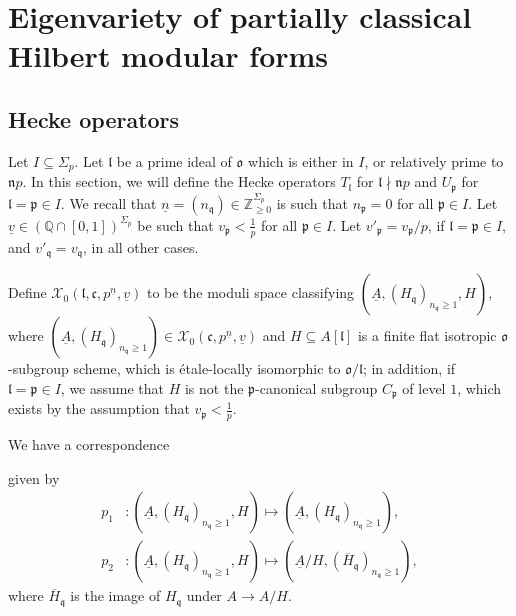 \documentclass[11pt]{amsart}
\theoremstyle{definition} %
\theoremstyle{plain} %
\theoremstyle{remark} %
\newcommand{\QQ}{{\mathbb Q}}
\newcommand{\ZZ}{{\mathbb Z}}
\newcommand{\cX}{{\mathcal X}}
\newcommand{\frakc}{\mathfrak c}
\newcommand{\frakl}{\mathfrak l}
\newcommand{\frakn}{\mathfrak n}
\newcommand{\frako}{\mathfrak o}
\newcommand{\frakp}{\mathfrak p}
\newcommand{\frakq}{\mathfrak q}
\begin{document}
\section{Eigenvariety of partially classical Hilbert modular forms}
\subsection{Hecke operators}
Let $I\subseteq \Sigma_p$. 
Let $\frakl$ be a prime ideal of $\frako$ which is either in $I$, or relatively prime to  $\frakn p$. 
In this section,  we will define the Hecke operators $T_\frakl$ for $\frakl\nmid \frakn p $ and $U_\frakp$ for $\frakl=\frakp\in I$. 
We recall that  $\underline{n} = (n_\frakq) \in \ZZ_{\geqslant 0}^{\Sigma_p}$ is  such that $n_\frakp=0$ for all $\frakp\in I$.
Let  $\underline{v}\in (\QQ\cap [0,1])^{\Sigma_p}$  be such that  $v_\frakp <\frac{1}{p}$ for all  $\frakp\in I $. 
Let   $v'_\frakp = v_\frakp/p$, if  $\frakl=\frakp\in I $, and $v'_\frakq = v_\frakq$, in all other cases.

Define $\cX_0(\frakl,\frakc,p^{\underline{n}},\underline{v})$ to be the moduli space classifying  $(\underline{A},(H_{\frakq})_{n_\frakq\geqslant 1}, H)$, where $(\underline{A}, (H_{\frakq})_{n_\frakq\geqslant 1})\in \cX_0(\frakc, p^{\underline{n}},\underline{v})$ and $H\subseteq A[\frakl]$ is a finite flat isotropic $\frako$-subgroup scheme, which is \'etale-locally isomorphic to $\frako/\frakl$; in addition, if $\frakl=\frakp\in I$, we assume that $H$ is not the  $\frakp$-canonical subgroup  $C_\frakp$ of level $1$, which exists by the assumption that $v_\frakp<\frac{1}{p}$.

We  have a correspondence 
\begin{center}
\end{center}
given by 
\begin{align*}
p_1&\colon  (\underline{A},(H_{\frakq})_{n_\frakq\geqslant 1},H) \mapsto (\underline{A}, (H_{\frakq})_{n_\frakq\geqslant 1}),  \\
p_2&\colon  (\underline{A},(H_{\frakq})_{n_\frakq\geqslant 1},H) \mapsto (\underline{A}/H, (\overline{H}_\frakq)_{n_\frakq\geqslant 1}), 
\end{align*}
where $\overline{H}_\frakq$ is the image of $H_\frakq$ under $A \rightarrow A/H$. 
\end{document}

